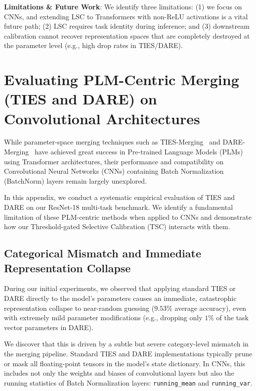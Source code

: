 \documentclass{article}
\theoremstyle{plain}
\theoremstyle{definition}
\theoremstyle{remark}
\begin{document}
\textbf{Limitations \& Future Work}: We identify three limitations: (1) we focus on CNNs, and extending LSC to Transformers with non-ReLU activations is a vital future path; (2) LSC requires task identity during inference; and (3) downstream calibration cannot recover representation spaces that are completely destroyed at the parameter level (e.g., high drop rates in TIES/DARE).




\clearpage
\appendix
\onecolumn
\section{Evaluating PLM-Centric Merging (TIES and DARE) on Convolutional Architectures}
\label{sec:appendix_advanced_merging}

While parameter-space merging techniques such as TIES-Merging~\cite{yadav2023ties} and DARE-Merging~\cite{yu2024dare} have achieved great success in Pre-trained Language Models (PLMs) using Transformer architectures, their performance and compatibility on Convolutional Neural Networks (CNNs) containing Batch Normalization (BatchNorm) layers remain largely unexplored. 

In this appendix, we conduct a systematic empirical evaluation of TIES and DARE on our ResNet-18 multi-task benchmark. We identify a fundamental limitation of these PLM-centric methods when applied to CNNs and demonstrate how our Threshold-gated Selective Calibration (TSC) interacts with them.

\subsection{Categorical Mismatch and Immediate Representation Collapse}
During our initial experiments, we observed that applying standard TIES or DARE directly to the model's parameters causes an immediate, catastrophic representation collapse to near-random guessing ($9.53\%$ average accuracy), even with extremely mild parameter modifications (e.g., dropping only $1\%$ of the task vector parameters in DARE).

We discover that this is driven by a subtle but severe category-level mismatch in the merging pipeline. Standard TIES and DARE implementations typically prune or mask all floating-point tensors in the model's state dictionary. In CNNs, this includes not only the weights and biases of convolutional layers but also the running statistics of Batch Normalization layers: \texttt{running\_mean} and \texttt{running\_var}. 
\end{document}
